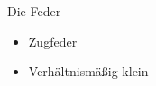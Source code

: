 \begin{frame}{Die Feder}
    \begin{itemize}
        \item{Zugfeder}
        \item{Verhältnismäßig klein}
    \end{itemize}
\end{frame}